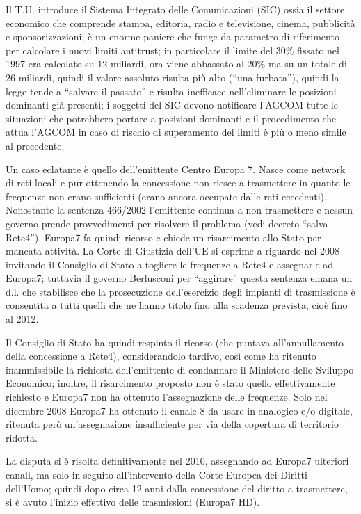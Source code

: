 Il T.U. introduce il Sistema Integrato delle Comunicazioni (SIC) ossia il settore economico che comprende stampa, editoria, radio e televisione, cinema, pubblicità e sponsorizzazioni; è un enorme paniere che funge da parametro di riferimento per calcolare i nuovi limiti antitrust; in particolare il limite del 30\% fissato nel 1997 era calcolato su 12 miliardi, ora viene abbassato al 20\% ma su un totale di 26 miliardi, quindi il valore assoluto risulta più alto (“una furbata”), quindi la legge tende a “salvare il passato” e risulta inefficace nell’eliminare le posizioni dominanti già presenti; i soggetti del SIC devono notificare l’AGCOM tutte le situazioni che potrebbero portare a posizioni dominanti e il procedimento che attua l’AGCOM in caso di rischio di superamento dei limiti è più o meno simile al precedente.


Un caso eclatante è quello dell’emittente Centro Europa 7. Nasce come network di reti locali e pur ottenendo la concessione non riesce a trasmettere in quanto le frequenze non erano sufficienti (erano ancora occupate dalle reti eccedenti). Nonostante la sentenza 466/2002 l’emittente continua a non trasmettere e nessun governo prende provvedimenti per risolvere il problema (vedi decreto “salva Rete4”). Europa7 fa quindi ricorso e chiede un risarcimento allo Stato per mancata attività. La Corte di Giustizia dell’UE si esprime a riguardo nel 2008 invitando il Consiglio di Stato a togliere le frequenze a Rete4 e assegnarle ad Europa7; tuttavia il governo Berlusconi per “aggirare” questa sentenza emana un d.l. che stabilisce che la prosecuzione dell’esercizio degli impianti di trasmissione è consentita a tutti quelli che ne hanno titolo fino alla scadenza prevista, cioè fino al 2012.


Il Consiglio di Stato ha quindi respinto il ricorso (che puntava all’annullamento della concessione a Rete4), considerandolo tardivo, così come ha ritenuto inammissibile la richiesta dell’emittente di condannare il Ministero dello Sviluppo Economico; inoltre, il risarcimento proposto non è stato quello effettivamente richiesto e Europa7 non ha ottenuto l’assegnazione delle frequenze. Solo nel dicembre 2008 Europa7 ha ottenuto il canale 8 da usare in analogico e/o digitale, ritenuta però un’assegnazione insufficiente per via della copertura di territorio ridotta.

La disputa si è risolta definitivamente nel 2010, assegnando ad Europa7 ulteriori canali, ma solo in seguito all’intervento della Corte Europea dei Diritti dell’Uomo; quindi dopo circa 12 anni dalla concessione del diritto a trasmettere, si è avuto l’inizio effettivo delle trasmissioni (Europa7 HD).
